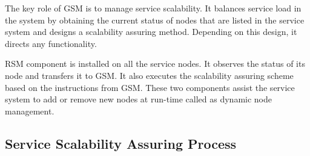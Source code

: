 The key role of GSM is to manage service scalability. It balances service load in the system by obtaining the current status of nodes that are listed in the service system and designs a scalability assuring method. Depending on this design, it directs any functionality.

RSM component is installed on all the service nodes. It observes the status of its node and transfers it to GSM. It also executes the scalability assuring scheme based on the instructions from GSM. These two components assist the service system to add or remove new nodes at run-time called as dynamic node management.

\subsection{Service Scalability Assuring Process}


